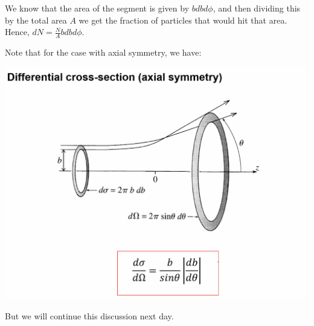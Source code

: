 \documentclass[../PHYS306Notes.tex]{subfiles}
\begin{document}
\begin{s}
We know that the area of the segment is given by $b dbd\phi$, and then dividing this by the total area $A$ we get the fraction of particles that would hit that area. Hence, $dN = \frac{N}{A}bdbd\phi$.
\end{s}
Note that for the case with axial symmetry, we have:
\begin{center}
    \includegraphics[scale=0.7]{Lecture-27/l27-img10.png}
\end{center}
But we will continue this discussion next day.
\end{document}
